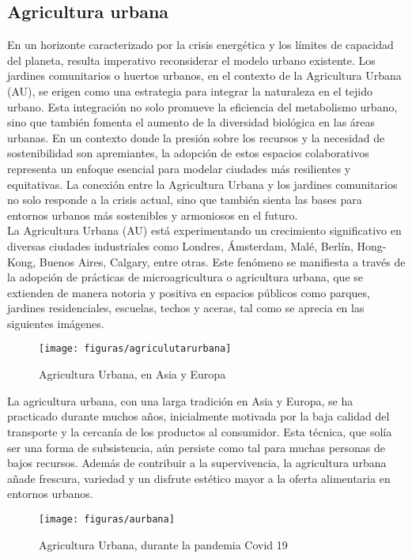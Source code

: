 \documentclass[12pt]{article}
\begin{document}
\subsection{Agricultura urbana}
En un horizonte caracterizado por la crisis energética y los límites de capacidad del planeta, resulta imperativo reconsiderar el modelo urbano existente. Los jardines comunitarios o huertos urbanos, en el contexto de la Agricultura Urbana (AU), se erigen como una estrategia para integrar la naturaleza en el tejido urbano. Esta integración no solo promueve la eficiencia del metabolismo urbano, sino que también fomenta el aumento de la diversidad biológica en las áreas urbanas. En un contexto donde la presión sobre los recursos y la necesidad de sostenibilidad son apremiantes, la adopción de estos espacios colaborativos representa un enfoque esencial para modelar ciudades más resilientes y equitativas. La conexión entre la Agricultura Urbana y los jardines comunitarios no solo responde a la crisis actual, sino que también sienta las bases para entornos urbanos más sostenibles y armoniosos en el futuro. \\
La Agricultura Urbana (AU) está experimentando un crecimiento significativo en diversas ciudades industriales como Londres, Ámsterdam, Malé, Berlín, Hong-Kong, Buenos Aires, Calgary, entre otras. Este fenómeno se manifiesta a través de la adopción de prácticas de microagricultura o agricultura urbana, que se extienden de manera notoria y positiva en espacios públicos como parques, jardines residenciales, escuelas, techos y aceras, tal como se aprecia en las siguientes imágenes. \\
\newpage
\begin{figure}[h]
	\centering
	\texttt{[image: figuras/agriculutarurbana]}
	\caption{Agricultura Urbana, en Asia y Europa}
	\label{fig:agriculutarurbana}
\end{figure}
La agricultura urbana, con una larga tradición en Asia y Europa, se ha practicado durante muchos años, inicialmente motivada por la baja calidad del transporte y la cercanía de los productos al consumidor. Esta técnica, que solía ser una forma de subsistencia, aún persiste como tal para muchas personas de bajos recursos. Además de contribuir a la supervivencia, la agricultura urbana añade frescura, variedad y un disfrute estético mayor a la oferta alimentaria en entornos urbanos. \\
\begin{figure}[h]
	\centering
	\texttt{[image: figuras/aurbana]}
	\caption{Agricultura Urbana, durante la pandemia Covid 19}
	\label{fig:aurbana}
\end{figure}
\end{document}
